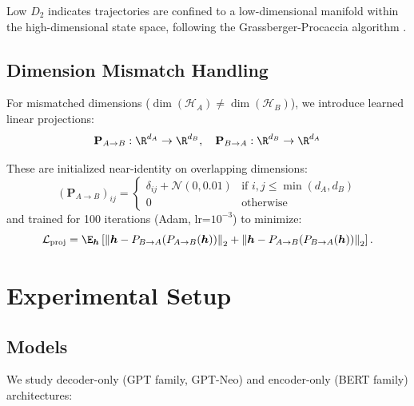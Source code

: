 \documentclass[10pt]{article} %
\theoremstyle{plain}
\theoremstyle{definition}
\theoremstyle{remark}
\newcommand{\cH}{\mathcal{H}}
\renewcommand{\norm}[1]{\left\lVert#1\right\rVert}
\renewcommand{\vect}[1]{\bm{#1}}
\newcommand{\mat}[1]{\mathbf{#1}}
\begin{document}
Low $D_2$ indicates trajectories are confined to a low-dimensional manifold within the high-dimensional state space, following the Grassberger-Procaccia algorithm \cite{grassberger1983}.

\subsection{Dimension Mismatch Handling}

For mismatched dimensions ($\dim(\cH_A) \neq \dim(\cH_B)$), we introduce learned linear projections:
\begin{equation}
    \mat{P}_{A \to B}: \R^{d_A} \to \R^{d_B}, \quad \mat{P}_{B \to A}: \R^{d_B} \to \R^{d_A}
\end{equation}

These are initialized near-identity on overlapping dimensions:
\begin{equation}
    (\mat{P}_{A \to B})_{ij} = \begin{cases}
        \delta_{ij} + \mathcal{N}(0, 0.01) & \text{if } i,j \leq \min(d_A, d_B) \\
        0 & \text{otherwise}
    \end{cases}
\end{equation}
and trained for 100 iterations (Adam, lr=$10^{-3}$) to minimize:
\begin{equation}
    \mathcal{L}_{\text{proj}} = \E_{\vect{h}}\left[\norm{\vect{h} - P_{B \to A}(P_{A \to B}(\vect{h}))}_2 + \norm{\vect{h} - P_{A \to B}(P_{B \to A}(\vect{h}))}_2\right].
\end{equation}

\section{Experimental Setup}

\subsection{Models}

We study decoder-only (GPT family, GPT-Neo) and encoder-only (BERT family) architectures:
\end{document}
